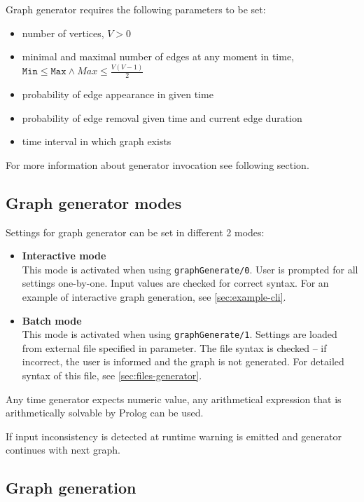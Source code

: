 \documentclass[11pt, a4paper]{article}
\newcommand{\pl}[1]{\texttt{#1}} %
\theoremstyle{plain}
\theoremstyle{definition}
\theoremstyle{remark}
\begin{document}
Graph generator requires the following parameters to be set:
\begin{itemize}
    \item number of vertices, $V > 0$
    \item minimal and maximal number of edges at any moment in time, 
        $\pl{Min} \le \pl{Max} \land Max \le \frac{ V(V-1)}{2}$
    \item probability of edge appearance in given time
    \item probability of edge removal given time and current edge duration
    \item time interval in which graph exists
\end{itemize}

For more information about generator invocation see following section.

\subsection{Graph generator modes}
\label{sec:generator-modes}
Settings for graph generator can be set in different 2 modes:
\begin{itemize}
\item \textbf{Interactive mode} \\
This mode is activated when using \pl{graphGenerate/0}. 
User is prompted for all settings one-by-one. Input values are checked for correct syntax. 
For an example of interactive graph generation, see \autoref{sec:example-cli}.
\item \textbf{Batch mode} \\
This mode is activated when using \pl{graphGenerate/1}. 
Settings are loaded from external file specified in parameter. 
The file syntax is checked -- if incorrect, the user is informed and the graph is not generated. 
For detailed syntax of this file, see \autoref{sec:files-generator}.
\end{itemize}

Any time generator expects numeric value, any arithmetical expression
that is arithmetically solvable by Prolog can be used.

If input inconsistency is detected at runtime warning is emitted and generator
continues with next graph.

\subsection{Graph generation}
\label{sec:generator-generation}
\end{document}
